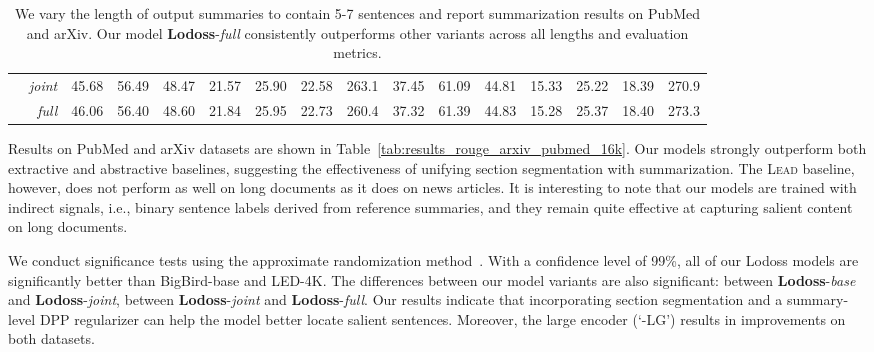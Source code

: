 \documentclass[11pt]{article}
\begin{document}
\begin{table*}[!t]
\begin{footnotesize}
\begin{tabular}{|lr||lll|lll|l||lll|lll|l|}
& \emph{joint} & 45.68 & 56.49 & 48.47\textcolor{red}{} & 21.57 & 25.90 & 22.58\textcolor{red}{} & 263.1\textcolor{blue}{} & 37.45 & 61.09 & 44.81\textcolor{red}{} & 15.33 & 25.22 & 18.39\textcolor{red}{} & 270.9\textcolor{blue}{}\\
& \emph{full} & 46.06 & 56.40 & 48.60\textcolor{red}{} & 21.84 & 25.95 & 22.73\textcolor{red}{} & 260.4\textcolor{blue}{} & 37.32 & 61.39 & 44.83\textcolor{red}{} & 15.28 & 25.37 & 18.40\textcolor{red}{} & 273.3\textcolor{blue}{}\\
\hline
\end{tabular}
\end{footnotesize}
\vspace{-0.05in}
\caption{We vary the length of output summaries to contain 5-7 sentences and report summarization results on PubMed and arXiv. 
Our model \textbf{Lodoss}-\emph{full} consistently outperforms other variants across all lengths and evaluation metrics.
}
\label{tab:results_rouge_PRF1}
\end{table*}



Results on PubMed and arXiv datasets are shown in Table~\ref{tab:results_rouge_arxiv_pubmed_16k}.
Our models strongly outperform both extractive and abstractive baselines, 
suggesting the effectiveness of unifying section segmentation with summarization.
The \textsc{Lead} baseline, however, does not perform as well on long documents as it does on news articles.
It is interesting to note that 
our models are trained with indirect signals,
i.e., binary sentence labels derived from reference summaries, 
and they remain quite effective at capturing salient content on long documents.

We conduct significance tests using the approximate randomization method~\cite{riezler-maxwell-2005-pitfalls, significance_test}.
With a confidence level of 99\%, 
all of our Lodoss models are significantly better than BigBird-base and LED-4K.
The differences between our model variants are also significant: 
between \textbf{Lodoss}-\emph{base} and \textbf{Lodoss}-\emph{joint}, between \textbf{Lodoss}-\emph{joint} and \textbf{Lodoss}-\emph{full}. 
Our results indicate that incorporating section segmentation and a summary-level DPP regularizer can help the model better locate salient sentences.
Moreover, the large encoder (`-LG') results in improvements on both datasets.
\end{document}

